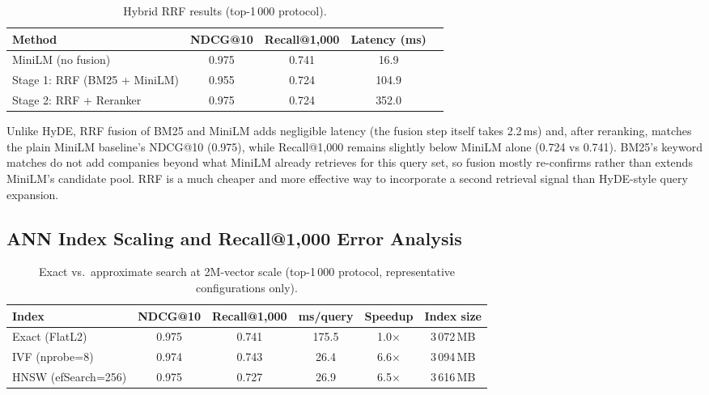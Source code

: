 \documentclass[a4paper,oneside,bibliography=totoc]{scrbook}
\begin{document}
\label{sec:rrf_result}

\begin{table}[ht]
\centering
\caption{Hybrid RRF results (top-1\,000 protocol).}
\label{tab:rrf}
\begin{tabular}{lcccc}
\toprule
\textbf{Method} & \textbf{NDCG@10} & \textbf{Recall@1{,}000} & \textbf{Latency (ms)} \\
\midrule
MiniLM (no fusion)              & 0.975 & 0.741 & 16.9 \\
Stage 1: RRF (BM25 + MiniLM)    & 0.955 & 0.724 & 104.9 \\
Stage 2: RRF + Reranker          & 0.975 & 0.724 & 352.0 \\
\bottomrule
\end{tabular}
\end{table}

Unlike HyDE, RRF fusion of BM25 and MiniLM adds negligible latency (the fusion step itself takes 2.2\,ms) and, after reranking, matches the plain MiniLM baseline's NDCG@10 (0.975), while Recall@1{,}000 remains slightly below MiniLM alone (0.724 vs 0.741). BM25's keyword matches do not add companies beyond what MiniLM already retrieves for this query set, so fusion mostly re-confirms rather than extends MiniLM's candidate pool. RRF is a much cheaper and more effective way to incorporate a second retrieval signal than HyDE-style query expansion.

\subsection{ANN Index Scaling and Recall@1{,}000 Error Analysis}
\label{sec:ann_scaling_result}

\begin{table}[ht]
\centering
\caption{Exact vs.\ approximate search at 2M-vector scale (top-1\,000 protocol, representative configurations only).}
\label{tab:ann_scaling}
\begin{tabular}{lccccc}
\toprule
\textbf{Index} & \textbf{NDCG@10} & \textbf{Recall@1{,}000} & \textbf{ms/query} & \textbf{Speedup} & \textbf{Index size} \\
\midrule
Exact (FlatL2)        & 0.975 & 0.741 & 175.5 & 1.0$\times$ & 3\,072\,MB \\
IVF (nprobe=8)         & 0.974 & 0.743 & 26.4  & 6.6$\times$ & 3\,094\,MB \\
HNSW (efSearch=256)    & 0.975 & 0.727 & 26.9  & 6.5$\times$ & 3\,616\,MB \\
\bottomrule
\end{tabular}
\end{table}
\end{document}
